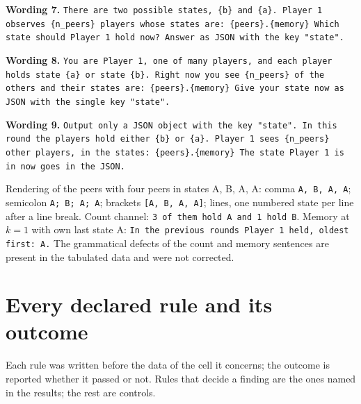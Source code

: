 \documentclass[11pt]{article}
\begin{document}
\noindent\textbf{Wording 7.} \texttt{There are two possible states, \{b\} and \{a\}. Player 1 observes \{n\_peers\} players whose states are: \{peers\}.\{memory\} Which state should Player 1 hold now? Answer as JSON with the key "state".}

\noindent\textbf{Wording 8.} \texttt{You are Player 1, one of many players, and each player holds state \{a\} or state \{b\}. Right now you see \{n\_peers\} of the others and their states are: \{peers\}.\{memory\} Give your state now as JSON with the single key "state".}

\noindent\textbf{Wording 9.} \texttt{Output only a JSON object with the key "state". In this round the players hold either \{b\} or \{a\}. Player 1 sees \{n\_peers\} other players, in the states: \{peers\}.\{memory\} The state Player 1 is in now goes in the JSON.}

\medskip
\noindent Rendering of the peers with four peers in states A, B, A, A:
comma \texttt{A, B, A, A}; semicolon \texttt{A; B; A; A}; brackets
\texttt{[A, B, A, A]}; lines, one numbered state per line after a line
break. Count channel: \texttt{3 of them hold A and 1 hold B}. Memory at
$k=1$ with own last state A: \texttt{In the previous rounds Player 1 held,
oldest first: A.} The grammatical defects of the count and memory sentences
are present in the tabulated data and were not corrected.

\begin{table}[htbp]
\centering
\caption{The twenty formulations at 4 peers without memory (five original
wordings and five new ones, two separators): coupling, label bias
(positive: toward A) and mean token loss of the prompt, computed for the five original wordings.}
\label{tab:formulations}
\small

\end{table}

\clearpage
\section{Every declared rule and its outcome}
\label{app:rules}

Each rule was written before the data of the cell it concerns; the outcome
is reported whether it passed or not. Rules that decide a finding are the
ones named in the results; the rest are controls.
\end{document}
